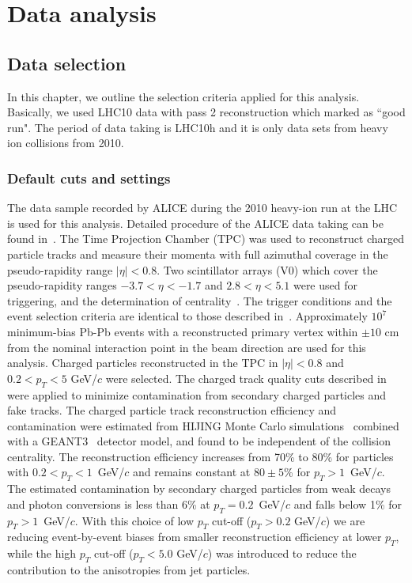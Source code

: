 \chapter{Data analysis}
\section{Data selection}

In this chapter, we outline the selection criteria applied for this analysis. Basically, we used LHC10 data with pass 2 reconstruction which marked as ``good run". The period of data taking is LHC10h and it is only data sets from heavy ion collisions from 2010. 



\subsection{Default cuts and settings}
 
 The data sample recorded by ALICE during the 2010 heavy-ion run at the
LHC is used for this analysis. Detailed procedure of the ALICE
data taking can be found
in~\cite{Aamodt:2008zz,Carminati:2004fp,Alessandro:2006yt}. The Time
Projection Chamber (TPC) was used to reconstruct charged particle
tracks and measure their momenta with full azimuthal coverage in the
pseudo-rapidity range $|\eta|<0.8$. Two scintillator
arrays (V0) which cover the pseudo-rapidity ranges $-3.7<\eta<-1.7$
and $2.8<\eta<5.1$ were used for triggering, and the determination of
centrality~\cite{Aamodt:2010cz}. The trigger
conditions and the event selection criteria are identical to those
described in~\cite{Aamodt:2010pa, Aamodt:2010cz}.
Approximately $10^7$ minimum-bias Pb-Pb events with
a reconstructed primary vertex within $\pm 10$ cm from the nominal
interaction point in the beam direction are used for this
analysis. Charged particles reconstructed in the TPC in $|\eta|<0.8$
and $0.2<p_T<5$ GeV/$c$ were selected. The charged track quality cuts
described in~\cite{Aamodt:2010pa} were applied to minimize
contamination from secondary charged particles and fake tracks. The
charged particle track reconstruction efficiency and contamination
were estimated from {\sc HIJING} Monte Carlo
simulations~\cite{Wang:1991hta} combined with a {\sc
GEANT3}~\cite{Brun:1994aa} detector model, and found to be independent of
the collision centrality. The reconstruction efficiency increases from
70\% to 80\% for particles with $0.2<p_T<1$~GeV/$c$ and remains
constant at $80 \pm 5$\% for $p_T>1$~GeV/$c$. The estimated
contamination by secondary charged particles from weak decays and
photon conversions is less than 6\% at $p_T=0.2$~GeV/$c$ and falls
below 1\% for $p_T>1$~GeV/$c$.
With this choice of low $p_T$ cut-off ($p_T > 0.2$ GeV/$c$) we are reducing event-by-event biases from smaller reconstruction efficiency 
at lower $p_T$, while the high $p_T$ cut-off ($p_T < 5.0$ GeV/$c$) was introduced to reduce the contribution to the anisotropies from jet particles. 


